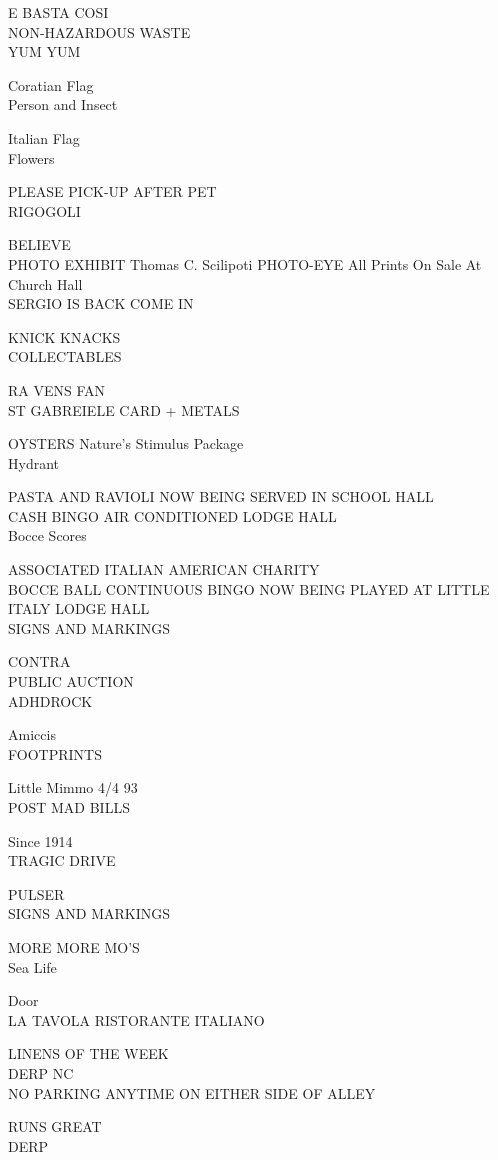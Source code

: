 \documentclass[10pt,letterpaper]{article}
\begin{document}
E BASTA COSI\\
NON{-}HAZARDOUS WASTE\\
YUM YUM

Coratian Flag\\
Person and Insect

Italian Flag\\
Flowers

PLEASE PICK{-}UP AFTER PET\\
RIGOGOLI

BELIEVE\\
PHOTO EXHIBIT Thomas C. Scilipoti PHOTO{-}EYE All Prints On Sale At Church Hall\\
SERGIO IS BACK COME IN

KNICK KNACKS\\
COLLECTABLES

RA VENS FAN\\
ST GABREIELE CARD + METALS

OYSTERS Nature's Stimulus Package\\
Hydrant

PASTA AND RAVIOLI NOW BEING SERVED IN SCHOOL HALL\\
CASH BINGO AIR CONDITIONED LODGE HALL\\
Bocce Scores

ASSOCIATED ITALIAN AMERICAN CHARITY\\
BOCCE BALL CONTINUOUS BINGO NOW BEING PLAYED AT LITTLE ITALY LODGE HALL\\
SIGNS AND MARKINGS

CONTRA\\
PUBLIC AUCTION\\
ADHDROCK

Amiccis\\
FOOTPRINTS

Little Mimmo 4/4 93\\
POST MAD BILLS

Since 1914\\
TRAGIC DRIVE

PULSER\\
SIGNS AND MARKINGS

MORE MORE MO'S\\
Sea Life

Door\\
LA TAVOLA RISTORANTE ITALIANO

LINENS OF THE WEEK\\
DERP NC\\
NO PARKING ANYTIME ON EITHER SIDE OF ALLEY

RUNS GREAT\\
DERP
\end{document}
